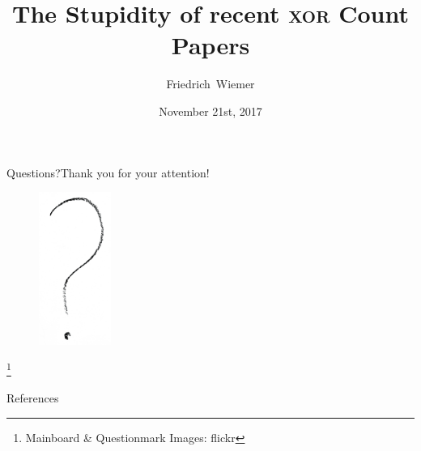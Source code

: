 \documentclass[12pt,mathserif,professionalfont]{beamer}
\title{The Stupidity of recent \textsc{xor} Count Papers}
\subtitle{}
\author[Friedrich~Wiemer]{Friedrich~Wiemer}
\institute{%
    FluxFingers\\[0.5em]
    Workgroup Symmetric Cryptography\\
    Ruhr University Bochum
}
\date{November 21st, 2017}
\newcommand{\blfootnote}[1]{%
    \begingroup
        \renewcommand\thefootnote{}\footnote{#1}%
        \addtocounter{footnote}{-1}%
    \endgroup
}
\begin{document}
\begin{frame}
    \titlepage{}
\end{frame}




\begin{frame}{Questions?}{Thank you for your attention!}
    \begin{figure}[!htb]
        \includegraphics[height=50mm]{data/flickr/questionmark.png}
    \end{figure}
    \blfootnote{\scriptsize Mainboard \& Questionmark Images: flickr}
\end{frame}

\begin{frame}[allowframebreaks]{References}
    \tiny
    \printbibliography{}
\end{frame}
\end{document}
